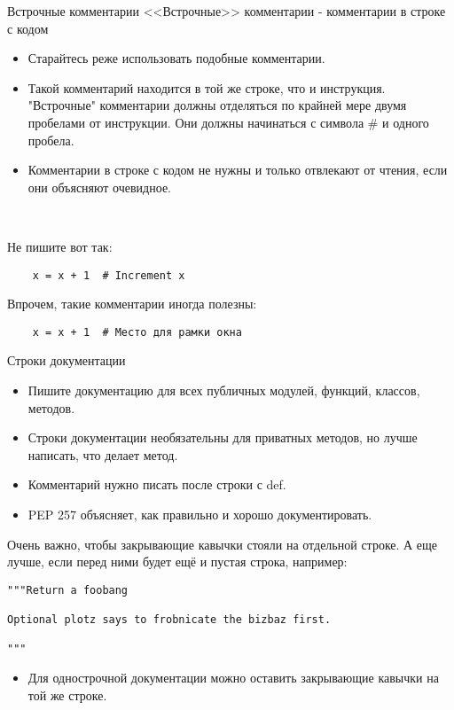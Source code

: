 \documentclass[xcolor=table]{beamer}
\begin{document}
\begin{frame}[fragile]{Встрочные комментарии}
	<<Встрочные>> комментарии - комментарии в строке с кодом
	\begin{itemize}
		\item Старайтесь реже использовать подобные комментарии.
		\item Такой комментарий находится в той же строке, что и инструкция. "Встрочные" комментарии должны отделяться по крайней мере двумя пробелами от инструкции. Они должны начинаться с символа \# и одного пробела.
		\item Комментарии в строке с кодом не нужны и только отвлекают от чтения, если они объясняют очевидное. 
	\end{itemize}
	
	~
	
	Не пишите вот так:
	\begin{verbatim}
	x = x + 1  # Increment x
	\end{verbatim}
	Впрочем, такие комментарии иногда полезны:	
	\begin{verbatim}
	x = x + 1  # Место для рамки окна
	\end{verbatim}
\end{frame}

\begin{frame}[fragile]{Строки документации}
	\begin{itemize}
		\item Пишите документацию для всех публичных модулей, функций, классов, методов.
		\item Строки документации необязательны для приватных методов, но лучше написать, что делает метод. 
		\item Комментарий нужно писать после строки с def.
		\item PEP 257 объясняет, как правильно и хорошо документировать.
	\end{itemize}
	Очень важно, чтобы закрывающие кавычки стояли на отдельной строке. А еще лучше, если перед ними будет ещё и пустая строка, например: 	
	\begin{verbatim}
"""Return a foobang

Optional plotz says to frobnicate the bizbaz first.

"""
	\end{verbatim}
	\begin{itemize}
		\item Для однострочной документации можно оставить закрывающие кавычки на той же строке.
	\end{itemize}	
\end{frame}
\end{document}

